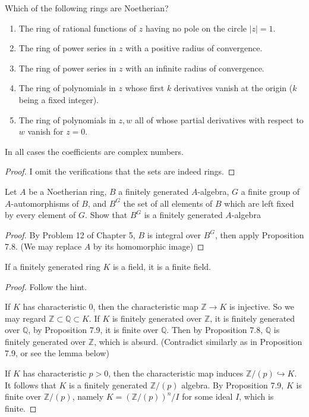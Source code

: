 \documentclass{solution}
\begin{document}
\begin{problem}
    Which of the following rings are Noetherian?
    \begin{enumerate}
        \item The ring of rational functions of $z$ having no pole on the circle $\left\lvert z \right\rvert = 1$.
        \item The ring of power series in $z$ with a positive radius of convergence.
        \item The ring of power series in $z$ with an infinite radius of convergence.
        \item The ring of polynomials in $z$ whose first $k$ derivatives vanish at the origin ($k$ being a fixed integer).
        \item The ring of polynomials in $z, w$ all of whose partial derivatives with respect to $w$ vanish for $z = 0$.
    \end{enumerate}
    In all cases the coefficients are complex numbers.
\end{problem}

\begin{proof}
    I omit the verifications that the sets are indeed rings.

    \TODO
\end{proof}

\begin{problem}
    Let $A$ be a Noetherian ring, $B$ a finitely generated $A$-algebra, $G$ a finite group of $A$-automorphisms of $B$, and $B^G$ the set of all elements of $B$ which are left fixed by every element of $G$. Show that $B^G$ is a finitely generated $A$-algebra
\end{problem}

\begin{proof}
    By Problem 12 of Chapter 5, $B$ is integral over $B^G$, then apply Proposition 7.8. (We may replace $A$ by its homomorphic image)
\end{proof}

\begin{problem}
    If a finitely generated ring $K$ is a field, it is a finite field.
\end{problem}

\begin{proof}
    Follow the hint.
    
    If $K$ has characteristic $0$, then the characteristic map $\mathbb{Z} \rightarrow K$ is injective. So we may regard $\mathbb{Z} \subset \mathbb{Q} \subset K$. If $K$ is finitely generated over $\mathbb{Z}$, it is finitely generated over $\mathbb{Q}$, by Proposition 7.9, it is finite over $\mathbb{Q}$. Then by Proposition 7.8, $\mathbb{Q}$ is finitely generated over $\mathbb{Z}$, which is absurd. (Contradict similarly as in Proposition 7.9, or see the lemma below)

    If $K$ has characteristic $p \gt 0$, then the characteristic map induces $\mathbb{Z} / (p) \hookrightarrow K$. It follows that $K$ is a finitely generated $\mathbb{Z} / (p)$ algebra. By Proposition 7.9, $K$ is finite over $\mathbb{Z} / (p)$, namely $K = (\mathbb{Z} / (p))^n / I$ for some ideal $I$, which is finite.
\end{proof}
\end{document}
